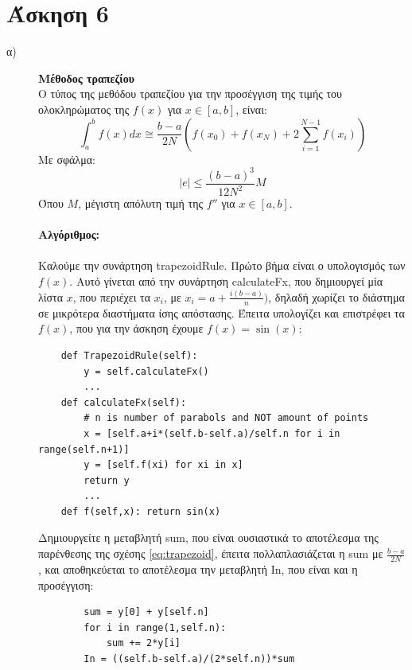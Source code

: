 \documentclass[a4paper,11pt]{article}
\newcommand{\lt}{\latintext}
\newcommand{\gt}{\greektext}
\begin{document}
{\section*{Άσκηση 6}
\begin{description}
\item[α)]{\textbf{ Μέθοδος τραπεζίου}}\\
Ο τύπος της μεθόδου τραπεζίου για την προσέγγιση της τιμής του ολοκληρώματος της $f(x)$ για $x\in[a,b]$, είναι:
\begin{equation}
    \int_{a}^{b}f(x)dx \cong \frac{b-a}{2N}(f(x_0)+f(x_N) + 2\sum_{i=1}^{N-1}f(x_i)) \tag{6.1}\label{eq:trapezoid}
\end{equation}
Με σφάλμα: 
\begin{equation}
    |e| \leq \frac{(b-a)^3}{12N^2}M  \tag{6.2}\label{eq:trapezoiderror}
\end{equation}
Όπου $M$, μέγιστη απόλυτη τιμή της $f''$ για  $x\in[a,b]$.\\\\
\textbf{Αλγόριθμος:}\\\\
Καλούμε την συνάρτηση {\lt trapezoidRule}. Πρώτο βήμα είναι ο υπολογισμός των $f(x)$. Αυτό γίνεται από την συνάρτηση {\lt calculateFx}, που δημιουργεί μία λίστα $x$, που περιέχει τα $x_i$, με $x_i = a + \frac{i(b-a)}{n})$, δηλαδή χωρίζει το διάστημα σε μικρότερα διαστήματα ίσης απόστασης. Έπειτα υπολογίζει και επιστρέφει τα $f(x)$, που για την άσκηση έχουμε $f(x) = \sin(x)$:

    \lt
    \begin{verbatim}
    def TrapezoidRule(self):
        y = self.calculateFx()
        ...
    def calculateFx(self):
        # n is number of parabols and NOT amount of points
        x = [self.a+i*(self.b-self.a)/self.n for i in range(self.n+1)] 
        y = [self.f(xi) for xi in x]
        return y
        ...
    def f(self,x): return sin(x)
    \end{verbatim}
    \gt
Δημιουργείτε η μεταβλητή {\lt sum}, που είναι ουσιαστικά το αποτέλεσμα της παρένθεσης της σχέσης \eqref{eq:trapezoid}, έπειτα πολλαπλασιάζεται η {\lt sum} με $\frac{b-a}{2N}$, και αποθηκεύεται το αποτέλεσμα την μεταβλητή {\lt In}, που είναι και η προσέγγιση: 

    \lt
    \begin{verbatim}
        sum = y[0] + y[self.n]
        for i in range(1,self.n):
            sum += 2*y[i]
        In = ((self.b-self.a)/(2*self.n))*sum
    \end{verbatim}
    \gt


\end{description}}
\end{document}
